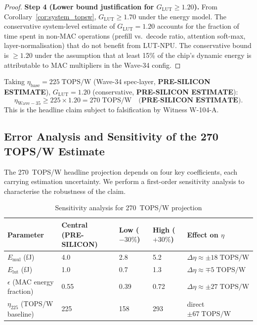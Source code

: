 \begin{proof}
\medskip
\noindent\textbf{Step 4 (Lower bound justification for $G_{\mathrm{LUT}} \geq 1.20$).}
From Corollary~\ref{cor:system_topsw}, $G_{\mathrm{LUT}} \geq 1.70$ under the
energy model.  The conservative system-level estimate of $G_{\mathrm{LUT}} = 1.20$
accounts for the fraction of time spent in non-MAC operations (prefill vs.\ decode
ratio, attention soft-max, layer-normalisation) that do not benefit from LUT-NPU.
The conservative bound is $\geq 1.20$ under the assumption that at least 15\% of
the chip's dynamic energy is attributable to MAC multipliers in the Wave-34 config.
\end{proof}

\begin{corollary}
\label{cor:270_topsw}
Taking $\eta_{\mathrm{base}} = 225\;\mathrm{TOPS/W}$ (Wave-34 spec-layer,
\textbf{PRE-SILICON ESTIMATE}), $G_{\mathrm{LUT}} = 1.20$ (conservative,
\textbf{PRE-SILICON ESTIMATE}):
\[
  \eta_{\mathrm{Wave-35}} \geq 225 \times 1.20 = 270\;\mathrm{TOPS/W}
  \quad\textbf{(PRE-SILICON ESTIMATE)}.
\]
This is the headline claim subject to falsification by Witness W-104-A.
\end{corollary}

\subsection{Error Analysis and Sensitivity of the 270 TOPS/W Estimate}

The 270~TOPS/W headline projection depends on four key coefficients, each
carrying estimation uncertainty.  We perform a first-order sensitivity analysis
to characterise the robustness of the claim.

\begin{table}[ht]
\centering
\caption{Sensitivity analysis for 270~TOPS/W projection}
\label{tab:sensitivity}
\begin{tabular}{lp{2.5cm}p{2.5cm}p{2.5cm}p{2.5cm}}
\hline
Parameter & Central (\textbf{PRE-SILICON}) & Low ($-30\%$) & High ($+30\%$) & Effect on $\eta$ \\
\hline
$E_{\mathrm{mul}}$ (fJ) & 4.0 & 2.8 & 5.2 & $\Delta\eta \approx \pm 18\;\mathrm{TOPS/W}$ \\
$E_{\mathrm{lut}}$ (fJ) & 1.0 & 0.7 & 1.3 & $\Delta\eta \approx \mp 5\;\mathrm{TOPS/W}$ \\
$\epsilon$ (MAC energy fraction) & 0.55 & 0.39 & 0.72 & $\Delta\eta \approx \pm 27\;\mathrm{TOPS/W}$ \\
$\eta_{225}$ (TOPS/W baseline) & 225 & 158 & 293 & direct $\pm 67\;\mathrm{TOPS/W}$ \\
\hline
\end{tabular}
\end{table}

